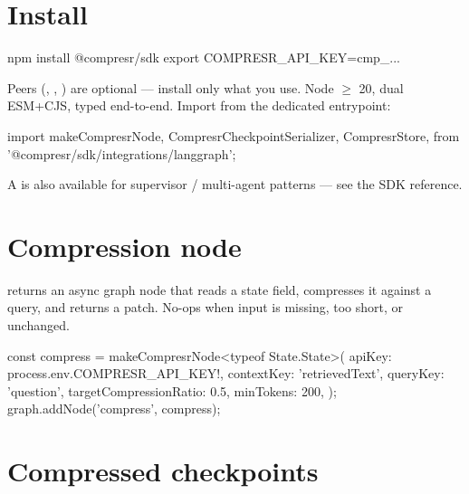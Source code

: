 \documentclass[10pt]{article}
\begin{document}

\section{Install}

\begin{shcode}
npm install @compresr/sdk
export COMPRESR_API_KEY=cmp_...
\end{shcode}

Peers (,
,
) are optional --- install only what you use.
Node $\geq$ 20, dual ESM+CJS, typed end-to-end. Import from the dedicated
entrypoint:

\begin{tscode}
import {
  makeCompresrNode, CompresrCheckpointSerializer, CompresrStore,
} from '@compresr/sdk/integrations/langgraph';
\end{tscode}

A  is also available for supervisor /
multi-agent patterns --- see the SDK reference.

\section{Compression node}

 returns an async graph node that reads a
state field, compresses it against a query, and returns a patch. No-ops when
input is missing, too short, or unchanged.

\begin{tscode}
const compress = makeCompresrNode<typeof State.State>({
  apiKey:                 process.env.COMPRESR_API_KEY!,
  contextKey:             'retrievedText',
  queryKey:               'question',
  targetCompressionRatio: 0.5,
  minTokens:              200,
});
graph.addNode('compress', compress);
\end{tscode}

\section{Compressed checkpoints}
\end{document}
